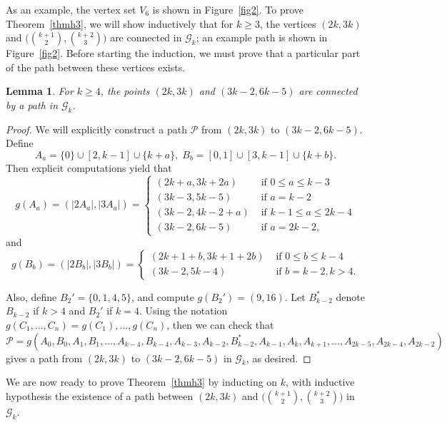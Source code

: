 \documentclass[10pt,a4paper]{article}
\newtheorem{lemma}[theorem]{Lemma}
\theoremstyle{definition}
\theoremstyle{remark}
\numberwithin{equation}{section}
\numberwithin{theorem}{section}
\newcommand{\calg}{\mathcal{G}}
\begin{document}
As an example, the vertex set $V_6$ is shown in Figure~\ref{fig2}. To prove Theorem~\ref{thmh3}, we will show inductively that for $k \geq 3$, the vertices $(2k,3k)$ and $\big(\binom{k+1}{2},\binom{k+2}{3}\big)$ are connected in $\calg_k$; an example path is shown in Figure~\ref{fig2}. Before starting the induction, we must prove that a particular part of the path between these vertices exists.

\begin{lemma}\label{lemmanew}
    For $k \geq 4$, the points $(2k,3k)$ and $(3k-2,6k-5)$ are connected by a path in $\calg_k$.
\end{lemma}
\begin{proof}
    We will explicitly construct a path $\mathcal{P}$ from $(2k,3k)$ to $(3k-2,6k-5)$. Define \[A_{a} = \{0\} \cup[2,k-1]\cup\{k+a\}, \; B_b = [0,1] \cup [3,k-1] \cup \{k+b\}.\] Then explicit computations yield that \[g(A_{a}) = (|2A_{a}|,|3A_{a}|) = \begin{cases}
        (2k+a,3k+2a) &\text{ if } 0\leq a \leq k-3 \\
        (3k-3,5k-5) &\text{ if } a = k-2 \\
        (3k-2,4k-2 + a) &\text{ if } k-1 \leq a \leq 2k-4\\
        (3k-2,6k-5) &\text{ if } a = 2k-2,
    \end{cases}\]
    and 
    \[g(B_{b}) = (|2B_{b}|,|3B_b|) = \begin{cases}
        (2k+1+b,3k+1+2b) &\text{ if } 0 \leq b \leq k-4 \\
        (3k-2,5k-4) &\text{ if } b = k-2, k >4.
    \end{cases}\]

    Also, define $B_2' = \{0,1,4,5\}$, and compute $g(B_2') = (9,16)$. Let $B_{k-2}^*$ denote $B_{k-2}$ if $k > 4$ and $B_2'$ if $k = 4$. Using the notation $g(C_1,\ldots,C_n) = g(C_1),\ldots,g(C_n)$, then we can check that \[\mathcal{P} = g(A_0,B_0,A_1,B_1,\ldots,A_{k-4},B_{k-4},A_{k-3},A_{k-2},B_{k-2}^*,A_{k-1},A_k,A_{k+1},\ldots,A_{2k-5},A_{2k-4},A_{2k-2})\] gives a path from $(2k,3k)$ to $(3k-2,6k-5)$ in $\calg_k$, as desired.
\end{proof}

We are now ready to prove Theorem~\ref{thmh3} by inducting on $k$, with inductive hypothesis the existence of a path between $(2k,3k)$ and $\big(\binom{k+1}{2},\binom{k+2}{3}\big)$ in $\calg_k$.
\end{document}
